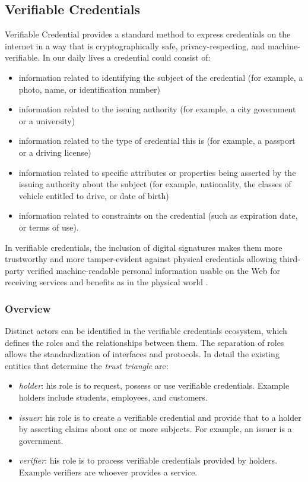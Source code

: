 \subsection{Verifiable Credentials}
Verifiable Credential \cite{vcW3C} provides a standard method to express credentials on the internet in a way that is cryptographically safe, privacy-respecting, and machine-verifiable.
In our daily lives a credential could consist of:
\begin{itemize}
    \item information related to identifying the subject of the credential (for example, a photo, name, or identification number)
    \item information related to the issuing authority (for example, a city government or a university)
    \item information related to the type of credential this is (for example, a passport or a driving license)
    \item information related to specific attributes or properties being asserted by the issuing authority about the subject (for example, nationality, the classes of vehicle entitled to drive, or date of birth)
    \item information related to constraints on the credential (such as expiration date, or terms of use). 
\end{itemize}

In verifiable credentials, the inclusion of digital signatures makes them more trustworthy and more tamper-evident against physical credentials allowing third-party verified machine-readable personal information usable on the Web for receiving services and benefits as in the physical world \cite{vcW3C}.

\subsubsection*{Overview}

Distinct actors can be identified in the verifiable credentials ecosystem, which defines the roles and the relationships between them. The separation of roles allows the standardization of interfaces and protocols. In detail the existing entities that determine the \textit{trust triangle} \cite{trustOverIP} are: 

\begin{itemize}
    \item \textit{holder}: his role is to request, possess or use verifiable credentials. Example holders include students, employees, and customers.
    \item \textit{issuer}: his role is to create a verifiable credential and provide that to a holder by asserting claims about one or more subjects. For example, an issuer is a government. 
    \item \textit{verifier}: his role is to process verifiable credentials provided by holders. Example verifiers are whoever provides a service. 
\end{itemize}

